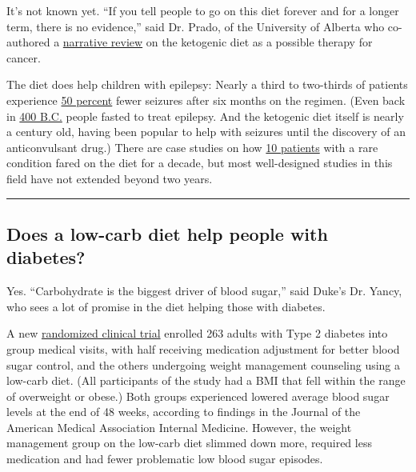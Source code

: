 It's not known yet. ``If you tell people to go on this diet forever and
for a longer term, there is no evidence,'' said Dr. Prado, of the
University of Alberta who co-authored a
\href{https://jandonline.org/article/S2212-2672(17)30115-6/fulltext}{narrative
review} on the ketogenic diet as a possible therapy for cancer.

The diet does help children with epilepsy: Nearly a third to two-thirds
of patients experience
\href{https://www.epilepsybehavior.com/article/S1525-5050(11)00112-0/fulltext}{50
percent} fewer seizures after six months on the regimen. (Even back in
\href{https://www.ncbi.nlm.nih.gov/pmc/articles/PMC6123874/}{400 B.C.}
people fasted to treat epilepsy. And the ketogenic diet itself is nearly
a century old, having been popular to help with seizures until the
discovery of an anticonvulsant drug.) There are case studies on how
\href{https://www.clinicalnutritionjournal.com/article/S0261-5614(17)31399-7/fulltext}{10
patients} with a rare condition fared on the diet for a decade, but most
well-designed studies in this field have not extended beyond two years.

\begin{center}\rule{0.5\linewidth}{\linethickness}\end{center}

\hypertarget{does-a-low-carb-diet-help-people-with-diabetes}{%
\subsection{Does a low-carb diet help people with
diabetes?}\label{does-a-low-carb-diet-help-people-with-diabetes}}

Yes. ``Carbohydrate is the biggest driver of blood sugar,'' said Duke's
Dr. Yancy, who sees a lot of promise in the diet helping those with
diabetes.

A new
\href{https://jamanetwork.com/journals/jamainternalmedicine/article-abstract/2753678?utm_campaign=articlePDF\%26utm_medium\%3DarticlePDFlink\%26utm_source\%3DarticlePDF\%26utm_content\%3Djamainternmed.2019.4802}{randomized
clinical trial} enrolled 263 adults with Type 2 diabetes into group
medical visits, with half receiving medication adjustment for better
blood sugar control, and the others undergoing weight management
counseling using a low-carb diet. (All participants of the study had a
BMI that fell within the range of overweight or obese.) Both groups
experienced lowered average blood sugar levels at the end of 48 weeks,
according to findings in the Journal of the American Medical Association
Internal Medicine. However, the weight management group on the low-carb
diet slimmed down more, required less medication and had fewer
problematic low blood sugar episodes.

